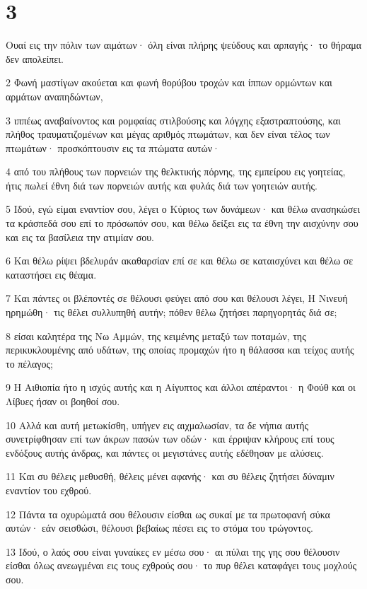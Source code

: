 \chapter{3}

\par Ουαί εις την πόλιν των αιμάτων· όλη είναι πλήρης ψεύδους και αρπαγής· το θήραμα δεν απολείπει.
\par 2 Φωνή μαστίγων ακούεται και φωνή θορύβου τροχών και ίππων ορμώντων και αρμάτων αναπηδώντων,
\par 3 ιππέως αναβαίνοντος και ρομφαίας στιλβούσης και λόγχης εξαστραπτούσης, και πλήθος τραυματιζομένων και μέγας αριθμός πτωμάτων, και δεν είναι τέλος των πτωμάτων· προσκόπτουσιν εις τα πτώματα αυτών·
\par 4 από του πλήθους των πορνειών της θελκτικής πόρνης, της εμπείρου εις γοητείας, ήτις πωλεί έθνη διά των πορνειών αυτής και φυλάς διά των γοητειών αυτής.
\par 5 Ιδού, εγώ είμαι εναντίον σου, λέγει ο Κύριος των δυνάμεων· και θέλω ανασηκώσει τα κράσπεδά σου επί το πρόσωπόν σου, και θέλω δείξει εις τα έθνη την αισχύνην σου και εις τα βασίλεια την ατιμίαν σου.
\par 6 Και θέλω ρίψει βδελυράν ακαθαρσίαν επί σε και θέλω σε καταισχύνει και θέλω σε καταστήσει εις θέαμα.
\par 7 Και πάντες οι βλέποντές σε θέλουσι φεύγει από σου και θέλουσι λέγει, Η Νινευή ηρημώθη· τις θέλει συλλυπηθή αυτήν; πόθεν θέλω ζητήσει παρηγορητάς διά σε;
\par 8 είσαι καλητέρα της Νω Αμμών, της κειμένης μεταξύ των ποταμών, της περικυκλουμένης από υδάτων, της οποίας προμαχών ήτο η θάλασσα και τείχος αυτής το πέλαγος;
\par 9 Η Αιθιοπία ήτο η ισχύς αυτής και η Αίγυπτος και άλλοι απέραντοι· η Φούθ και οι Λίβυες ήσαν οι βοηθοί σου.
\par 10 Αλλά και αυτή μετωκίσθη, υπήγεν εις αιχμαλωσίαν, τα δε νήπια αυτής συνετρίφθησαν επί των άκρων πασών των οδών· και έρριψαν κλήρους επί τους ενδόξους αυτής άνδρας, και πάντες οι μεγιστάνες αυτής εδέθησαν με αλύσεις.
\par 11 Και συ θέλεις μεθυσθή, θέλεις μένει αφανής· και συ θέλεις ζητήσει δύναμιν εναντίον του εχθρού.
\par 12 Πάντα τα οχυρώματά σου θέλουσιν είσθαι ως συκαί με τα πρωτοφανή σύκα αυτών· εάν σεισθώσι, θέλουσι βεβαίως πέσει εις το στόμα του τρώγοντος.
\par 13 Ιδού, ο λαός σου είναι γυναίκες εν μέσω σου· αι πύλαι της γης σου θέλουσιν είσθαι όλως ανεωγμέναι εις τους εχθρούς σου· το πυρ θέλει καταφάγει τους μοχλούς σου.
